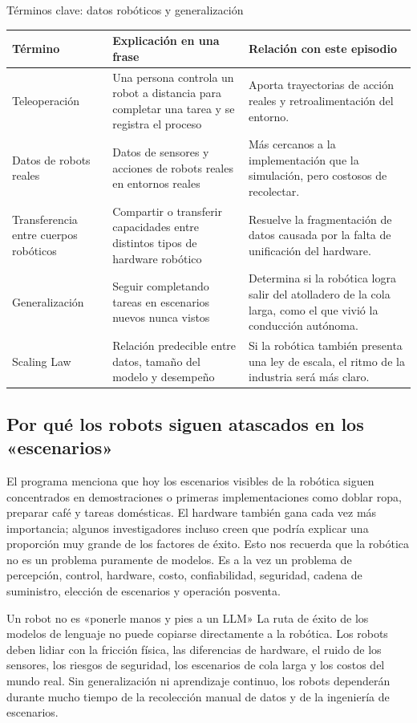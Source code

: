 \begin{knowledgebox}{Términos clave: datos robóticos y generalización}
\begin{tabularx}{\textwidth}{p{}p{}X}
\toprule
Término & Explicación en una frase & Relación con este episodio \\
\midrule
Teleoperación & Una persona controla un robot a distancia para completar una tarea y se registra el proceso & Aporta trayectorias de acción reales y retroalimentación del entorno. \\
Datos de robots reales & Datos de sensores y acciones de robots reales en entornos reales & Más cercanos a la implementación que la simulación, pero costosos de recolectar. \\
Transferencia entre cuerpos robóticos & Compartir o transferir capacidades entre distintos tipos de hardware robótico & Resuelve la fragmentación de datos causada por la falta de unificación del hardware. \\
Generalización & Seguir completando tareas en escenarios nuevos nunca vistos & Determina si la robótica logra salir del atolladero de la cola larga, como el que vivió la conducción autónoma. \\
Scaling Law & Relación predecible entre datos, tamaño del modelo y desempeño & Si la robótica también presenta una ley de escala, el ritmo de la industria será más claro. \\
\bottomrule
\end{tabularx}
\end{knowledgebox}

\subsection{Por qué los robots siguen atascados en los «escenarios»}

El programa menciona que hoy los escenarios visibles de la robótica siguen concentrados en demostraciones o primeras implementaciones como doblar ropa, preparar café y tareas domésticas. El hardware también gana cada vez más importancia; algunos investigadores incluso creen que podría explicar una proporción muy grande de los factores de éxito. Esto nos recuerda que la robótica no es un problema puramente de modelos. Es a la vez un problema de percepción, control, hardware, costo, confiabilidad, seguridad, cadena de suministro, elección de escenarios y operación posventa.

\begin{warningbox}{Un robot no es «ponerle manos y pies a un LLM»}
La ruta de éxito de los modelos de lenguaje no puede copiarse directamente a la robótica. Los robots deben lidiar con la fricción física, las diferencias de hardware, el ruido de los sensores, los riesgos de seguridad, los escenarios de cola larga y los costos del mundo real. Sin generalización ni aprendizaje continuo, los robots dependerán durante mucho tiempo de la recolección manual de datos y de la ingeniería de escenarios.
\end{warningbox}

